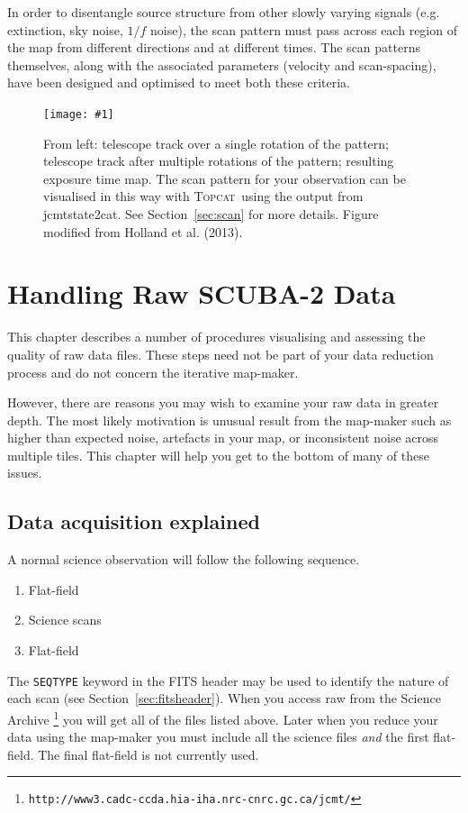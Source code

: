 \documentclass[twoside,11pt]{article}
\newcommand{\htmladdnormallink}[2]{#1}
\newcommand{\htmladdimg}[1]{}
\newcommand{\htmlref}[2]{#1}
\newenvironment{latexonly}{}{}
\newcommand{\latexhtml}[2]{#1}
\newcommand{\xref}[3]{#1}
\newcommand{\xlabel}[1]{}
\renewcommand{\_}{\texttt{\symbol{95}}}
\newcommand{\topcat}{\htmladdnormallink{\textsc{Topcat}}{http://www.starlink.ac.uk/topcat}}
\newcommand{\task}[1]{\textsf{#1}}
\newcommand{\param}[1]{\texttt{#1}}
\newcommand{\url}[1]{\texttt{#1}}
\newcommand{\jcmtstate}{\xref{\task{jcmtstate2cat}}{sun258}{JCMTSTATE2CAT}}
\newcommand{\myfig}[6]{
  \begin{figure}#2
    \centering\texttt{[image: \#1]}
    \typeout{#1 inserted on page \arabic{page}}
    \caption[#5]{\label{#4}\small #6}
  \end{figure}
}
\newcommand{\myfig}[6]{
    \label{#4} \htmladdimg{#1.png}\\
    \\
    Figure: #6\\
  }
\newcommand{\cref}[3]{\latexhtml{#1~\ref{#2}}{\htmlref{#3}{#2}}}
\begin{document}
In order to disentangle source structure from other
slowly varying signals (e.g. extinction, sky noise, $1/f$ noise), the
scan pattern must pass across each region of the map from different
directions and at different times. The scan patterns themselves, along
with the associated parameters (velocity and scan-spacing), have been
designed and optimised to meet both these criteria.

\myfig{sc21_wayne_scan}{[t!]}{width=0.98\linewidth}{fig:scan}{
  Illustration of the SCUBA-2 observing patterns}{
  From left: telescope track over a single rotation of the pattern;
  telescope track after multiple rotations of the pattern; resulting
  exposure time map. The scan pattern for your observation can be
  visualised in this way with \topcat\ using the output from
  \jcmtstate.  See \cref{Section}{sec:scan}{Displaying scan patterns} for
  more details.  Figure modified from Holland et al. (2013).
}

\clearpage

\section{\xlabel{data_files}Handling Raw SCUBA-2 Data}
\label{sec:raw}

This chapter describes a number of procedures visualising
and assessing the quality of raw data files.  These steps need not be part of
your data reduction process and do not concern the iterative map-maker.

However, there are reasons you may wish to examine your raw data in
greater depth. The most likely motivation is unusual result from the
map-maker such as higher than expected noise, artefacts in your map, or
inconsistent noise across multiple tiles.  This chapter will help you
get to the bottom of many of these issues.

\subsection{Data acquisition explained}
A normal science observation will follow the following sequence.
\vspace{-2mm}
\begin{enumerate}\itemsep-0.2em
\item Flat-field
\item Science scans
\item Flat-field
\end{enumerate}
\vspace{-2mm}
The \param{SEQ\_TYPE} keyword in the FITS header may be used to
identify the nature of each scan (see
\cref{Section}{sec:fitsheader}{Headers and file structure}).
When you access raw from the \htmladdnormallink{Science Archive}{http://www3.cadc-ccda.hia-iha.nrc-cnrc.gc.ca/jcmt/}
\begin{latexonly}
\hspace{-0.5em}\footnote{\url{http://www3.cadc-ccda.hia-iha.nrc-cnrc.gc.ca/jcmt/}}
\end{latexonly}
you will get all of the files listed above. Later when you
reduce your data using the map-maker you must include all
the science files \emph{and} the first flat-field.
The final flat-field is not currently used.
\end{document}
